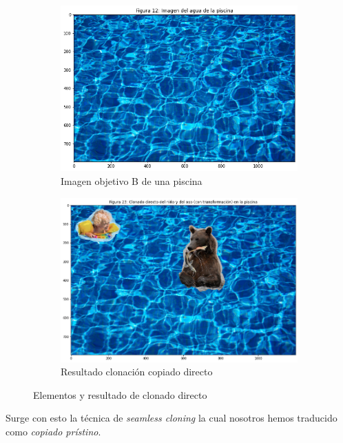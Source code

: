 \documentclass[11pt,twoside,titlepage,a4paper]{article}
\numberwithin{equation}{section} %
\theoremstyle{usual}
\begin{document}
\begin{figure}[h]
\begin{subfigure}[t]{0.36\textwidth}
        \includegraphics[width=\textwidth]{imagenes/PoissonImageEditing_cell_23_output_0.png}
        \caption{Imagen objetivo B de una piscina}
    \end{subfigure}
    \begin{subfigure}[t]{0.36\textwidth}
       \centering
        \includegraphics[width=\textwidth]{imagenes/PoissonImageEditing_cell_27_output_2.png}
        \caption{Resultado clonación copiado directo}
    \end{subfigure}
    \caption{Elementos y resultado de clonado directo}
    \label{fig:copiadoRegionesConexasClonadoDirecto}
\end{figure}

Surge con esto la técnica de \textit{seamless cloning} la cual nosotros hemos traducido como \textit{copiado prístino}.   
\end{document}
